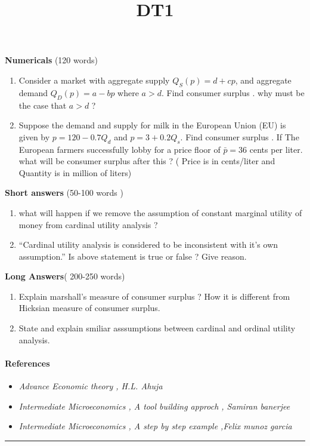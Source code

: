 \documentclass[
]{article}
\title{DT1}
\author{}
\date{\vspace{-2.5em}}
\providecommand{\tightlist}{%
  \setlength{\itemsep}{0pt}\setlength{\parskip}{0pt}}
\begin{document}
\maketitle

\textbf{Numericals} (120 words)

\begin{enumerate}
\def\labelenumi{\arabic{enumi}.}
\item
  Consider a market with aggregate supply \(Q_S(p)=d+cp\), and aggregate
  demand \(Q_D(p)=a−bp\) where \(a>d\). Find consumer surplus . why must
  be the case that \(a>d\) ?
\item
  Suppose the demand and supply for milk in the European Union (EU) is
  given by \(p = 120−0.7Q_d\) and \(p = 3+0.2Q_s\). Find consumer
  surplus . If The European farmers successfully lobby for a price floor
  of \(\bar p = 36\) cents per liter. what will be consumer surplus
  after this ? ( Price is in cents/liter and Quantity is in million of
  liters)
\end{enumerate}

\textbf{Short answers} (50-100 words )

\begin{enumerate}
\def\labelenumi{\arabic{enumi}.}
\item
  what will happen if we remove the assumption of constant marginal
  utility of money from cardinal utility analysis ?
\item
  ``Cardinal utility analysis is considered to be inconsistent with it's
  own assumption.'' Is above statement is true or false ? Give reason.
\end{enumerate}

\textbf{Long Answers}( 200-250 words)

\begin{enumerate}
\def\labelenumi{\arabic{enumi}.}
\item
  Explain marshall's measure of consumer surplus ? How it is different
  from Hicksian measure of consumer surplus.
\item
  State and explain smiliar asssumptions between cardinal and ordinal
  utility analysis.
\end{enumerate}

\hypertarget{references}{%
\paragraph{References}\label{references}}

\begin{itemize}
\tightlist
\item
  \emph{Advance Economic theory , H.L. Ahuja}
\item
  \emph{Intermediate Microeconomics , A tool building approch , Samiran
  banerjee}
\item
  \emph{Intermediate Microeconomics , A step by step example ,Felix
  munoz garcia}
\end{itemize}

\begin{center}\rule{0.5\linewidth}{0.5pt}\end{center}
\end{document}
